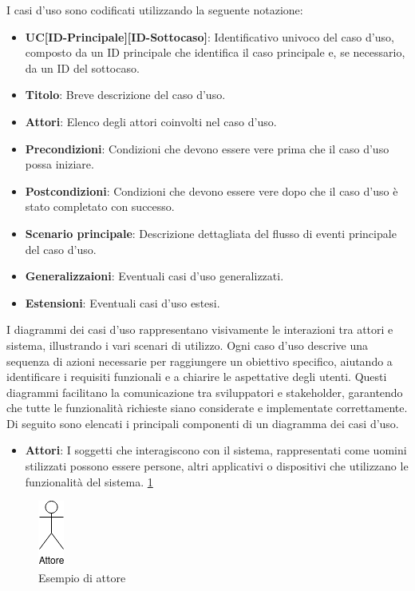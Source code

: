I casi d'uso sono codificati utilizzando la seguente notazione:

\begin{itemize}
    \item \textbf{UC[ID-Principale][ID-Sottocaso]}: Identificativo univoco del caso d'uso, composto da un ID principale che identifica il caso principale e, se necessario, da un ID del sottocaso.
    \item \textbf{Titolo}: Breve descrizione del caso d'uso.
    \item \textbf{Attori}: Elenco degli attori coinvolti nel caso d'uso.
    \item \textbf{Precondizioni}: Condizioni che devono essere vere prima che il caso d'uso possa iniziare.
    \item \textbf{Postcondizioni}: Condizioni che devono essere vere dopo che il caso d'uso è stato completato con successo.
    \item \textbf{Scenario principale}: Descrizione dettagliata del flusso di eventi principale del caso d'uso.
    \item \textbf{Generalizzaioni}: Eventuali casi d'uso generalizzati.
    \item \textbf{Estensioni}: Eventuali casi d'uso estesi.
\end{itemize}

I diagrammi dei casi d’uso rappresentano visivamente le interazioni tra attori e sistema,
illustrando i vari scenari di utilizzo. Ogni caso d’uso descrive una sequenza di 
azioni necessarie per raggiungere un obiettivo specifico, aiutando a identificare i 
requisiti funzionali e a chiarire le aspettative degli utenti. Questi diagrammi 
facilitano la comunicazione tra sviluppatori e stakeholder, garantendo che tutte le 
funzionalità richieste siano considerate e implementate correttamente. 
Di seguito sono elencati i principali componenti di un diagramma dei casi d’uso.

\begin{itemize}
    \item \textbf{Attori}: I soggetti che interagiscono con il sistema, rappresentati come uomini stilizzati possono essere persone, altri applicativi o dispositivi che utilizzano le funzionalità del sistema. \ref{fig:attore}
\end{itemize}

\begin{figure}[H]
    \centering
    \includegraphics{../../img/Attore.png}
    \caption{Esempio di attore}
    \label{fig:attore}
\end{figure}

